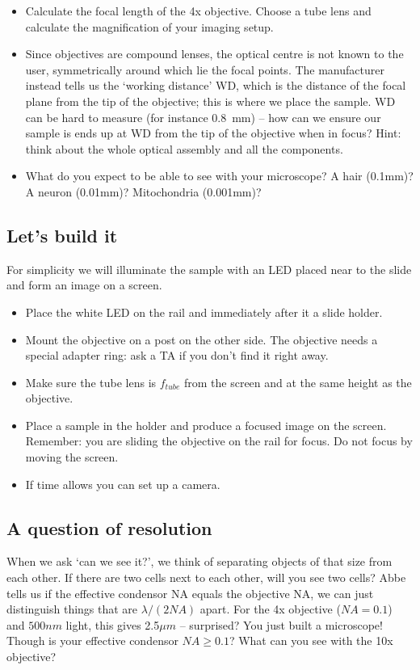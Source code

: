 \documentclass[a4paper]{report}
\begin{document}
\begin{itemize}
    \item Calculate the focal length of the 4x objective. Choose a tube lens and calculate the magnification of your imaging setup.
    
    \item Since objectives are compound lenses, the optical centre is not known to the user, symmetrically around which lie the focal points. The manufacturer instead tells us the `working distance' WD, which is the distance of the focal plane from the tip of the objective; this is where we place the sample. WD can be hard to measure (for instance 0.8~mm) -- how can we ensure our sample is ends up at WD from the tip of the objective when in focus? Hint: think about the whole optical assembly and all the components. 
    \item What do you expect to be able to see with your microscope? A hair (0.1mm)? A neuron (0.01mm)? Mitochondria (0.001mm)?

\end{itemize}
  
   
\subsection{Let's build it}
For simplicity we will illuminate the sample with an LED placed near to the slide and form an image on a screen.

\begin{itemize}
\item Place the white LED on the rail and immediately after it a slide holder.
\item Mount the objective on a post on the other side. The objective needs a special adapter ring: ask a TA if you don't find it right away. 
\item Make sure the tube lens is $f_{tube}$ from the screen and at the same height as the objective. 
\item Place a sample in the holder and produce a focused image on the screen. Remember: you are sliding the objective on the rail for focus. Do not focus by moving the screen.
\item If time allows you can set up a camera.
\end{itemize}
 


\pagebreak
\hypertarget{hintTo-imaging}{}

\subsection{A question of resolution}
When we ask `can we see it?', we think of separating objects of that size from each other. If there are two cells next to each other, will you see two cells?
Abbe tells us if the effective condensor NA equals the objective NA, we can just distinguish things that are $\lambda / (2NA)$ apart.
For the 4x objective ($NA=0.1$) and $500nm$ light, this gives 2.5$\mu m$ -- surprised?
You just built a microscope! Though is your effective condensor $NA\geq 0.1$?
What can you see with the 10x objective?
\end{document}
